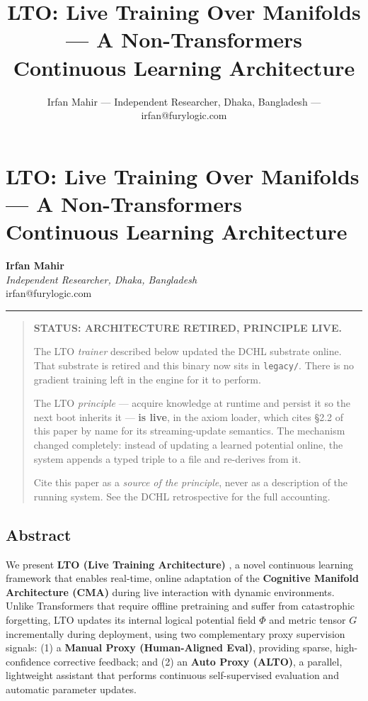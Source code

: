 \documentclass[
  11pt,
  a4paper,
]{article}
\title{LTO: Live Training Over Manifolds --- A Non-Transformers
Continuous Learning Architecture}
\author{Irfan Mahir --- Independent Researcher, Dhaka, Bangladesh ---
irfan@furylogic.com}
\date{}
\begin{document}
\maketitle

{
\hypersetup{linkcolor=}
\setcounter{tocdepth}{3}
\tableofcontents
}
\section{LTO: Live Training Over Manifolds --- A Non-Transformers
Continuous Learning
Architecture}\label{lto-live-training-over-manifolds-a-non-transformers-continuous-learning-architecture}

\textbf{Irfan Mahir}\\
\emph{Independent Researcher, Dhaka, Bangladesh}\\
irfan@furylogic.com

\begin{center}\rule{0.5\linewidth}{0.5pt}\end{center}

\begin{quote}
\textbf{STATUS: ARCHITECTURE RETIRED, PRINCIPLE LIVE.}

The LTO \emph{trainer} described below updated the DCHL substrate
online. That substrate is retired and this binary now sits in
\texttt{legacy/}. There is no gradient training left in the engine for
it to perform.

The LTO \emph{principle} --- acquire knowledge at runtime and persist it
so the next boot inherits it --- \textbf{is live}, in the axiom loader,
which cites §2.2 of this paper by name for its streaming-update
semantics. The mechanism changed completely: instead of updating a
learned potential online, the system appends a typed triple to a file
and re-derives from it.

Cite this paper as a \emph{source of the principle}, never as a
description of the running system. See the DCHL retrospective for the
full accounting.
\end{quote}

\subsection{Abstract}\label{abstract}

We present \textbf{LTO (Live Training Architecture)} , a novel
continuous learning framework that enables real-time, online adaptation
of the \textbf{Cognitive Manifold Architecture (CMA)} during live
interaction with dynamic environments. Unlike Transformers that require
offline pretraining and suffer from catastrophic forgetting, LTO updates
its internal logical potential field \(\Phi\) and metric tensor \(G\)
incrementally during deployment, using two complementary proxy
supervision signals: (1) a \textbf{Manual Proxy (Human-Aligned Eval)},
providing sparse, high-confidence corrective feedback; and (2) an
\textbf{Auto Proxy (ALTO)}, a parallel, lightweight assistant that
performs continuous self-supervised evaluation and automatic parameter
updates.
\end{document}
